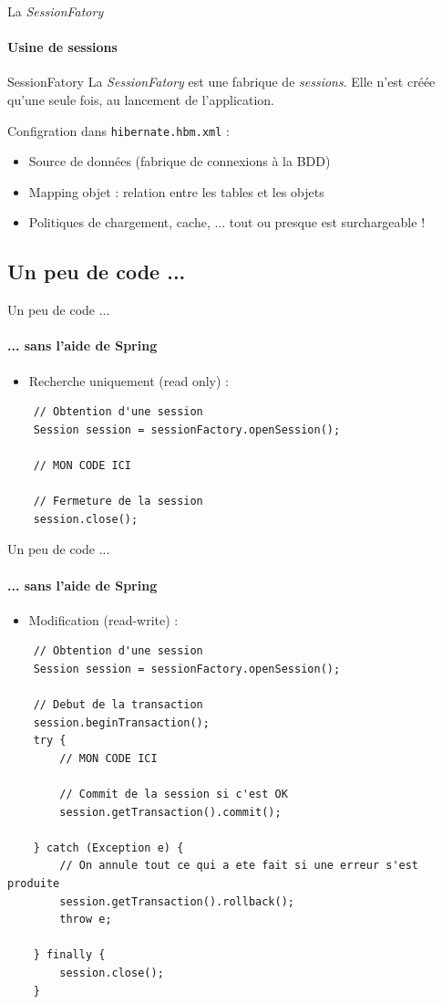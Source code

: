 \documentclass[compress]{beamer}%
\begin{document}
\begin{frame}{La \emph{SessionFatory}}
	\framesubtitle{Usine de sessions}
	
	\begin{block}{SessionFatory}
	La \emph{SessionFatory} est une fabrique de \emph{sessions}. Elle n'est créée qu'une seule fois, au lancement de l'application.
	\end{block}	
	
	\pause	
	Configration dans \texttt{hibernate.hbm.xml} :
	\begin{itemize}
	\item Source de données (fabrique de connexions à la BDD)
	\item Mapping objet : relation entre les tables et les objets
	\item Politiques de chargement, cache, ... tout ou presque est surchargeable !
	\end{itemize}
\end{frame}

	
\subsection{Un peu de code ...}

\begin{frame}[containsverbatim]{Un peu de code ...}
	\framesubtitle{... sans l'aide de Spring}
	
	\begin{itemize}
	\item Recherche uniquement (read only) : 	
	\end{itemize}	
	\begin{lstlisting}
	// Obtention d'une session
	Session session = sessionFactory.openSession();
	
	// MON CODE ICI	
	
	// Fermeture de la session
	session.close();
	\end{lstlisting}
	
\end{frame}

\begin{frame}[containsverbatim]{Un peu de code ...}
	\framesubtitle{... sans l'aide de Spring}
	
	\begin{itemize}
	\item Modification (read-write) :
	\end{itemize}	
	\begin{lstlisting}
	// Obtention d'une session
	Session session = sessionFactory.openSession();
 
 	// Debut de la transaction
	session.beginTransaction();
	try {
		// MON CODE ICI	
	
		// Commit de la session si c'est OK
		session.getTransaction().commit();
		
	} catch (Exception e) {
		// On annule tout ce qui a ete fait si une erreur s'est produite
		session.getTransaction().rollback();
		throw e;
		
	} finally {
		session.close();
	}
	\end{lstlisting}
	
\end{frame}
\end{document}
